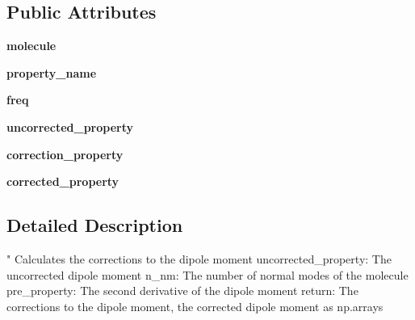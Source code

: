 \subsection*{Public Attributes}
\begin{DoxyCompactItemize}
\item 
\hypertarget{classPropertyclasses_1_1Property__1__Tensor_a0bc12d39b33acba6f0ec4e7aea287697}{{\bfseries molecule}}\label{classPropertyclasses_1_1Property__1__Tensor_a0bc12d39b33acba6f0ec4e7aea287697}

\item 
\hypertarget{classPropertyclasses_1_1Property__1__Tensor_a48991d57a29bafe8c36992bddaf37ca4}{{\bfseries property\+\_\+name}}\label{classPropertyclasses_1_1Property__1__Tensor_a48991d57a29bafe8c36992bddaf37ca4}

\item 
\hypertarget{classPropertyclasses_1_1Property__1__Tensor_a1c8505bcbb89583861d52225240dbb38}{{\bfseries freq}}\label{classPropertyclasses_1_1Property__1__Tensor_a1c8505bcbb89583861d52225240dbb38}

\item 
\hypertarget{classPropertyclasses_1_1Property__1__Tensor_aaf0de1a5088ea0b5ba1af5df4f66ce3d}{{\bfseries uncorrected\+\_\+property}}\label{classPropertyclasses_1_1Property__1__Tensor_aaf0de1a5088ea0b5ba1af5df4f66ce3d}

\item 
\hypertarget{classPropertyclasses_1_1Property__1__Tensor_a9802d9fb26453b4e51cf140f0d42abb6}{{\bfseries correction\+\_\+property}}\label{classPropertyclasses_1_1Property__1__Tensor_a9802d9fb26453b4e51cf140f0d42abb6}

\item 
\hypertarget{classPropertyclasses_1_1Property__1__Tensor_a8b0ca35890e19306109e0ec99c66e6b2}{{\bfseries corrected\+\_\+property}}\label{classPropertyclasses_1_1Property__1__Tensor_a8b0ca35890e19306109e0ec99c66e6b2}

\end{DoxyCompactItemize}


\subsection{Detailed Description}
\begin{DoxyVerb}" Calculates the corrections to the dipole moment
uncorrected_property: The uncorrected dipole moment
n_nm: The number of normal modes of the molecule
pre_property: The second derivative of the dipole moment
return: The corrections to the dipole moment, the corrected dipole 
moment as np.arrays\end{DoxyVerb}
 

